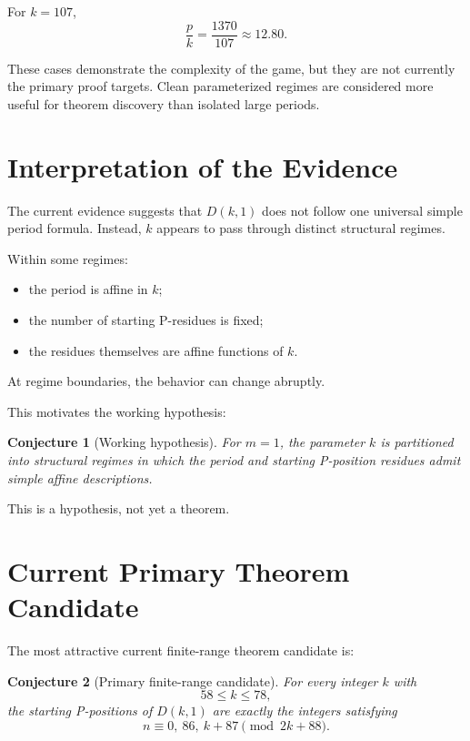 \documentclass[11pt]{article}
\newtheorem{conjecture}{Conjecture}
\begin{document}
For $k=107$,
\begin{equation}
    \frac{p}{k}=\frac{1370}{107}\approx12.80.
\end{equation}

These cases demonstrate the complexity of the game, but they are not currently the primary proof targets. Clean parameterized regimes are considered more useful for theorem discovery than isolated large periods.

\section{Interpretation of the Evidence}

The current evidence suggests that $D(k,1)$ does not follow one universal simple period formula. Instead, $k$ appears to pass through distinct structural regimes.

Within some regimes:
\begin{itemize}
    \item the period is affine in $k$;
    \item the number of starting P-residues is fixed;
    \item the residues themselves are affine functions of $k$.
\end{itemize}

At regime boundaries, the behavior can change abruptly.

This motivates the working hypothesis:

\begin{conjecture}[Working hypothesis]
For $m=1$, the parameter $k$ is partitioned into structural regimes in which the period and starting P-position residues admit simple affine descriptions.
\end{conjecture}

This is a hypothesis, not yet a theorem.

\section{Current Primary Theorem Candidate}

The most attractive current finite-range theorem candidate is:

\begin{conjecture}[Primary finite-range candidate]
For every integer $k$ with
\[
    58\le k\le78,
\]
the starting P-positions of $D(k,1)$ are exactly the integers satisfying
\[
    n\equiv0,\ 86,\ k+87\pmod{2k+88}.
\]
\end{conjecture}
\end{document}
